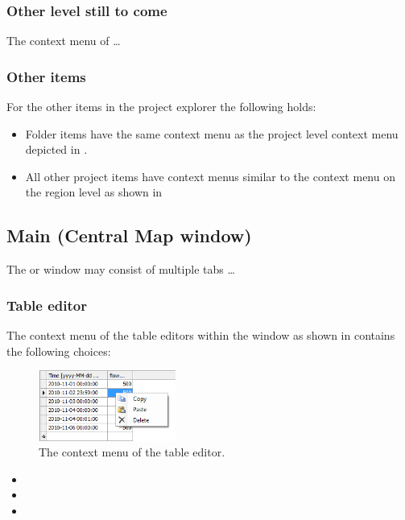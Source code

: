 \subsubsection{Other level still to come}
\label{subsubsec:otherLevel1}
The context menu of \ldots 
%
\subsubsection{Other items}
\label{subsubsec:otheritems}
For the other items in the project explorer the following holds:
\begin{itemize}
	\item Folder items have the same context menu as the project level context menu depicted in .
	\item All other project items have context menus similar to the context menu on the region level as shown in  
\end{itemize}

\subsection{Main (Central Map window)}
\label{subsec:centralmap}
The  or  window may consist of multiple tabs \ldots

\subsubsection{Table editor}
\label{subsubsec:tableeditor}
The context menu of the table editors within the  window as shown in  contains the following choices: 
%
\begin{figure} [H]
	\centering
		\includegraphics[width=0.4\textwidth]{figures/chapter_overview/context_menu_table.png}
	\caption{The context menu of the table editor.}
	\label{fig:contextmenutable}
\end{figure}
\begin{itemize}
	\item {}
	\item {}
	\item {}
\end{itemize}
